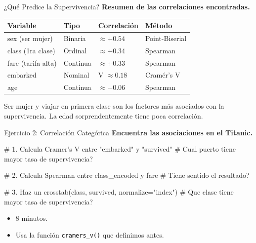 \documentclass[aspectratio=169, 11pt]{beamer}
\begin{document}
\begin{frame}[shrink=5]{¿Qué Predice la Supervivencia?}
  \vspace{-4pt}
  {\footnotesize\color{arcaDark}\bfseries
    Resumen de las correlaciones encontradas.}

  \vspace{6pt}
  {\scriptsize
  \begin{tabular}{@{}llll@{}}
    \toprule
    \textbf{Variable} & \textbf{Tipo} & \textbf{Correlación} & \textbf{Método} \\
    \midrule
    sex (ser mujer) & Binaria & $\approx +0.54$ & Point-Biserial \\
    class (1ra clase) & Ordinal & $\approx +0.34$ & Spearman \\
    fare (tarifa alta) & Continua & $\approx +0.33$ & Spearman \\
    embarked & Nominal & V $\approx 0.18$ & Cramér's V \\
    age & Continua & $\approx -0.06$ & Spearman \\
    \bottomrule
  \end{tabular}
  }

  \vspace{6pt}
  {\footnotesize\color{arcaDark}
    \faLightbulb\hspace{4pt}
    Ser mujer y viajar en primera clase son los factores más asociados
    con la supervivencia. La edad sorprendentemente tiene poca correlación.}
\end{frame}

\begin{frame}[fragile,shrink=28]{Ejercicio 2: Correlación Categórica \hfill {\normalsize\faLaptopCode}}
  \vspace{-6pt}
  {\footnotesize\color{arcaDark}\bfseries
    Encuentra las asociaciones en el Titanic.}

  \vspace{4pt}
  \begin{pyblock}
# 1. Calcula Cramer's V entre "embarked" y "survived"
#    Cual puerto tiene mayor tasa de supervivencia?

# 2. Calcula Spearman entre class_encoded y fare
#    Tiene sentido el resultado?

# 3. Haz un crosstab(class, survived, normalize="index")
#    Que clase tiene mayor tasa de supervivencia?
  \end{pyblock}

  \vspace{4pt}
  {\scriptsize\color{textMuted}
  \begin{itemize}\setlength{\itemsep}{3pt}
    \item[{\color{arcaRed}\scriptsize\faClock}] 8 minutos.
    \item[{\color{codeOrange}\scriptsize\faLightbulb}]
      Usa la función \texttt{cramers\_v()} que definimos antes.
  \end{itemize}
  }
\end{frame}
\end{document}
